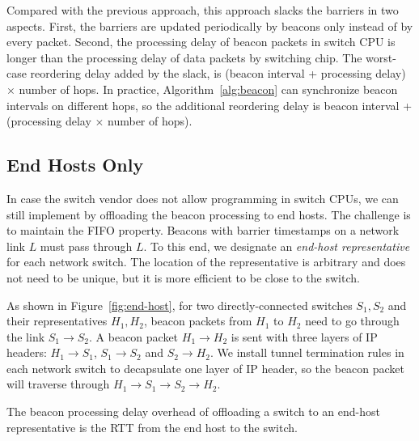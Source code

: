 Compared with the previous approach, this approach slacks the barriers in two aspects.
First, the barriers are updated periodically by beacons only instead of by every packet.
Second, the processing delay of beacon packets in switch CPU is longer than the processing delay of data packets by switching chip.
The worst-case reordering delay added by the slack, is (beacon interval + processing delay) $\times$ number of hops.
In practice, Algorithm~\ref{alg:beacon} can synchronize beacon intervals on different hops, so the additional reordering delay is beacon interval + (processing delay $\times$ number of hops).

\subsection{End Hosts Only}
\label{sec:end-host}

In case the switch vendor does not allow programming in switch CPUs, we can still implement \sys by offloading the beacon processing to end hosts.
The challenge is to maintain the FIFO property.
Beacons with barrier timestamps on a network link $L$ must pass through $L$.
To this end, we designate an \textit{end-host representative} for each network switch.
The location of the representative is arbitrary and does not need to be unique, but it is more efficient to be close to the switch.

As shown in Figure~\ref{fig:end-host}, for two directly-connected switches $S_1, S_2$ and their representatives $H_1, H_2$, beacon packets from $H_1$ to $H_2$ need to go through the link $S_1 \rightarrow S_2$.
A beacon packet $H_1 \rightarrow H_2$ is sent with three layers of IP headers: $H_1 \rightarrow S_1$, $S_1 \rightarrow S_2$ and $S_2 \rightarrow H_2$.
We install tunnel termination rules in each network switch to decapsulate one layer of IP header, so the beacon packet will traverse through $H_1 \rightarrow S_1 \rightarrow S_2 \rightarrow H_2$.

The beacon processing delay overhead of offloading a switch to an end-host representative is the RTT from the end host to the switch.
